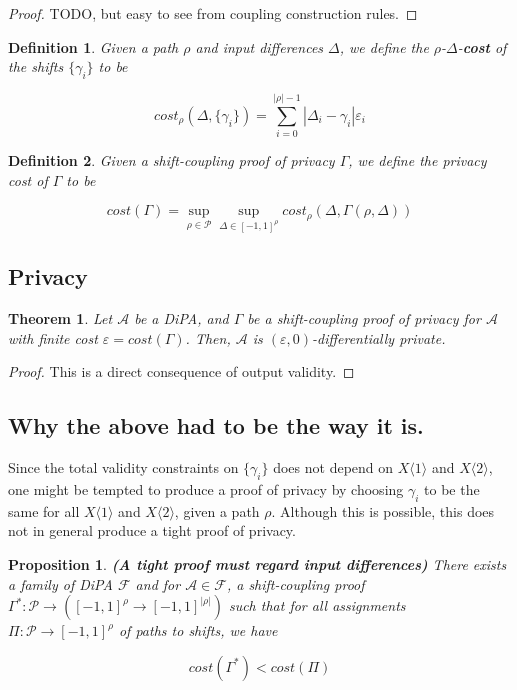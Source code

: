 \documentclass{article}
\newtheorem{theorem}{Theorem}
\newtheorem{proposition}{Proposition}[section]
\newtheorem{definition}{Definition}[section]
\renewcommand{\epsilon}{\varepsilon}
\newcommand{\1}{\langle 1 \rangle}
\newcommand{\2}{\langle 2 \rangle}
\begin{document}
\begin{proof}
    TODO, but easy to see from coupling construction rules.
\end{proof}

\begin{definition}
    Given a path $\rho$ and input differences $\Delta$, we define the $\rho$-$\Delta$-\textbf{cost} of the shifts $\{\gamma_i\}$ to be

    \[cost_{\rho} (\Delta, \{\gamma_i\}) = \sum_{i = 0}^{|\rho| - 1} |\Delta_i - \gamma_i| \epsilon_i\]
\end{definition}

\begin{definition}
    Given a shift-coupling proof of privacy $\Gamma$, we define the privacy cost of $\Gamma$ to be

    \[cost(\Gamma) = \sup_{\rho \in \mathcal{P}} \sup_{\Delta \in [-1, 1]^{\rho}} cost_{\rho}(\Delta, \Gamma(\rho, \Delta))\]
\end{definition}

\subsection{Privacy}

\begin{theorem}
    Let $\mathcal{A}$ be a DiPA, and $\Gamma$ be a shift-coupling proof of privacy for $\mathcal{A}$ with finite cost $\epsilon = cost(\Gamma)$. Then, $\mathcal{A}$ is $(\epsilon, 0)$-differentially private.
\end{theorem}

\begin{proof}
    This is a direct consequence of output validity. 
\end{proof}

\subsection{Why the above had to be the way it is.}

Since the total validity constraints on $\{\gamma_i\}$ does not depend on $X \1$ and $X \2$, one might be tempted to produce a proof of privacy by choosing $\gamma_i$ to be the same for all $X \1$ and $X \2$, given a path $\rho$. Although this is possible, this does not in general produce a tight proof of privacy.

\begin{proposition}
    \label{prop:proofs_must_regard_input_differences}
    \textbf{(A tight proof must regard input differences)} There exists a family of DiPA $\mathcal{F}$ and for $\mathcal{A} \in \mathcal{F}$, a shift-coupling proof $\Gamma^*: \mathcal{P} \to ([-1, 1]^{\rho} \to [-1, 1]^{|\rho|})$ such that for all assignments $\Pi: \mathcal{P} \to [-1, 1]^{\rho}$ of paths to shifts, we have 

    \[cost(\Gamma^*) < cost(\Pi)\]
\end{proposition}
\end{document}
